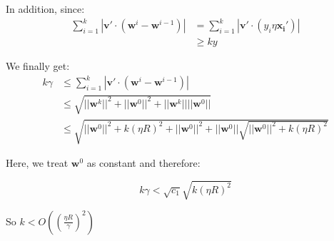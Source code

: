 \documentclass{article}
\newcommand{\V}[1]{\boldsymbol{#1}}
\begin{document}
In addition, since:
\begin{equation}
\begin{split}
\sum_{i=1}^k|\V{v'}\cdot (\V{w}^i-\V{w}^{i-1})|&=\sum_{i=1}^k|\V{v'}\cdot (y_i\eta\V{x_i}')|\\
&\geq ky
\end{split}
\end{equation}

We finally get:
\begin{equation}
\begin{split}
k\gamma &\leq \sum_{i=1}^k|\V{v'}\cdot (\V{w}^i-\V{w}^{i-1})|\\
&\leq \sqrt{||\V{w}^k||^2+||\V{w}^0||^2+||\V{w}^k||||\V{w}^0||}\\
&\leq\sqrt{||\V{w}^0||^2+k(\eta R)^2+||\V{w}^0||^2+||\V{w}^0||\sqrt{||\V{w}^0||^2+k(\eta R)^2}}
\end{split}
\end{equation}

Here, we treat \(\V{w}^0\) as constant and therefore:

\begin{equation}
k\gamma < \sqrt{c_1}\sqrt{k(\eta R)^2}
\end{equation}

So \(k<O((\frac{\eta R}{\gamma})^2)\)
\end{document}
